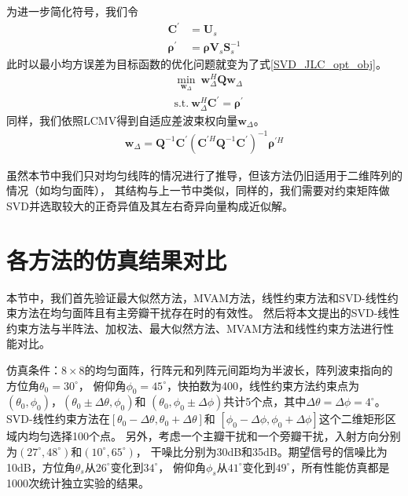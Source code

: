 \documentclass[master]{thesis-uestc}
\begin{document}
为进一步简化符号，我们令
\begin{subequations}
    \begin{align}
        \bm{C}^\prime &= \bm{U}_s \\
        \bm{\rho}^\prime &= \bm{\rho}\bm{V}_s\bm{S}_s^{-1}
    \end{align}
\end{subequations}
此时以最小均方误差为目标函数的优化问题就变为了式\eqref{SVD_JLC_opt_obj}。
\begin{equation}\label{SVD_JLC_opt_obj}
    \begin{aligned}
        &\min_{\bm{w}_\Delta} ~ \bm{w}^H_\Delta\bm{Q}\bm{w}_{\Delta} \\
        &\text{s.t.} ~ \bm{w}^H_\Delta\bm{C}^\prime = \bm{\rho}^\prime
    \end{aligned}
\end{equation}
同样，我们依照LCMV得到自适应差波束权向量$\bm{w}_\Delta$。
\begin{equation}
    \begin{aligned}
        \bm{w}_{\Delta} = \bm{Q}^{-1}\bm{C}^\prime
        \left(\bm{C}^{\prime H}\bm{Q}^{-1}\bm{C}^\prime\right)^{-1}\bm{\rho}^{\prime H}
    \end{aligned}
\end{equation}

虽然本节中我们只对均匀线阵的情况进行了推导，但该方法仍旧适用于二维阵列的情况（如均匀面阵），
其结构与上一节中类似，同样的，我们需要对约束矩阵做SVD并选取较大的正奇异值及其左右奇异向量构成近似解。

\section{各方法的仿真结果对比}
本节中，我们首先验证最大似然方法，MVAM方法，线性约束方法和SVD-线性约束方法在均匀面阵且有主旁瓣干扰存在时的有效性。
然后将本文提出的SVD-线性约束方法与半阵法、加权法、最大似然方法、MVAM方法和线性约束方法进行性能对比。

仿真条件：$8\times8$的均匀面阵，行阵元和列阵元间距均为半波长，阵列波束指向的方位角$\theta_0=30^\circ$，
俯仰角$\phi_0=45^\circ$，快拍数为400，线性约束方法约束点为$(\theta_0,\phi_0)$，$(\theta_0\pm\Delta\theta,\phi_0)$和
$(\theta_0,\phi_0\pm\Delta\phi)$共计5个点，其中$\Delta\theta=\Delta\phi=4^\circ$。
SVD-线性约束方法在$[\theta_0-\Delta\theta,\theta_0+\Delta\theta]$和
$[\phi_0-\Delta\phi,\phi_0+\Delta\phi]$这个二维矩形区域内均匀选择100个点。
另外，考虑一个主瓣干扰和一个旁瓣干扰，入射方向分别为$(27^\circ,48^\circ)$和$(10^\circ,65^\circ)$，
干噪比分别为30dB和35dB。期望信号的信噪比为10dB，方位角$\theta_s$从$26^\circ$变化到$34^\circ$，
俯仰角$\phi_s$从$41^\circ$变化到$49^\circ$，所有性能仿真都是1000次统计独立实验的结果。
\end{document}
